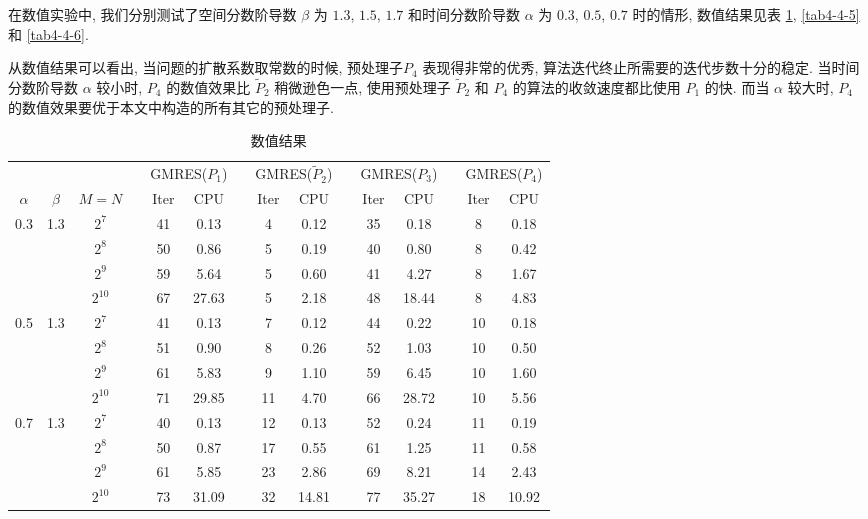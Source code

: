 \documentclass{ecnumaster}
\begin{document}
在数值实验中, 我们分别测试了空间分数阶导数 $\beta$ 为 $1.3$, $1.5$, $1.7$
和时间分数阶导数 $\alpha$ 为 $0.3$, $0.5$, $0.7$ 时的情形,
数值结果见表 \ref{tab4-4-4}, \ref{tab4-4-5} 和 \ref{tab4-4-6}.

从数值结果可以看出,
当问题的扩散系数取常数的时候,
预处理子$P_4$ 表现得非常的优秀,
算法迭代终止所需要的迭代步数十分的稳定.
当时间分数阶导数 $\alpha$ 较小时,
$P_4$ 的数值效果比 $\tilde{P}_2$ 稍微逊色一点,
使用预处理子 $\tilde{P}_2$ 和 $P_4$ 的算法的收敛速度都比使用 $P_1$ 的快.
而当 $\alpha$ 较大时,
$P_4$ 的数值效果要优于本文中构造的所有其它的预处理子.

\begin{table}[H]
\centering
\caption{数值结果} \label{tab4-4-4}\smallskip
\begin{tabular}{ccccccccccccccc} \toprule
& &  && \multicolumn{2}{c}{GMRES($P_1$)}
&& \multicolumn{2}{c}{GMRES($\tilde{P}_2$)}
&& \multicolumn{2}{c}{GMRES($P_3$)}
&& \multicolumn{2}{c}{GMRES($P_4$)} \\
$\alpha$ & $\beta$ & $M = N$ && Iter & CPU && Iter & CPU
&& Iter & CPU && Iter & CPU\\ \midrule
0.3 & 1.3
 & $2^7$     && 41 & 0.13 && 4 & 0.12 && 35 & 0.18 && 8 & 0.18 \\
&& $2^8$     && 50 & 0.86 && 5 & 0.19 && 40 & 0.80 && 8 & 0.42 \\
&& $2^9$     && 59 & 5.64 && 5 & 0.60 && 41 & 4.27 && 8 & 1.67 \\
&& $2^{10}$  && 67 & 27.63 && 5 & 2.18 && 48 & 18.44 && 8 & 4.83 \\ \midrule
0.5 & 1.3
 & $2^7$     && 41 & 0.13 && 7 & 0.12 && 44 & 0.22 && 10 & 0.18 \\
&& $2^8$     && 51 & 0.90 && 8 & 0.26 && 52 & 1.03 && 10 & 0.50  \\
&& $2^9$     && 61 & 5.83 && 9 & 1.10 && 59 & 6.45 && 10 & 1.60  \\
&& $2^{10}$  && 71 & 29.85 && 11 & 4.70 && 66 & 28.72 && 10 & 5.56  \\ \midrule
0.7 & 1.3
 & $2^7$     && 40 & 0.13 && 12 & 0.13 && 52 & 0.24 && 11 & 0.19  \\
&& $2^8$     && 50 & 0.87 && 17 & 0.55 && 61 & 1.25 && 11 & 0.58  \\
&& $2^9$     && 61 & 5.85 && 23 & 2.86 && 69 & 8.21 && 14 & 2.43  \\
&& $2^{10}$  && 73 &31.09 && 32 &14.81 && 77 &35.27 && 18 & 10.92  \\ \bottomrule
\end{tabular}
\end{table}
\end{document}

